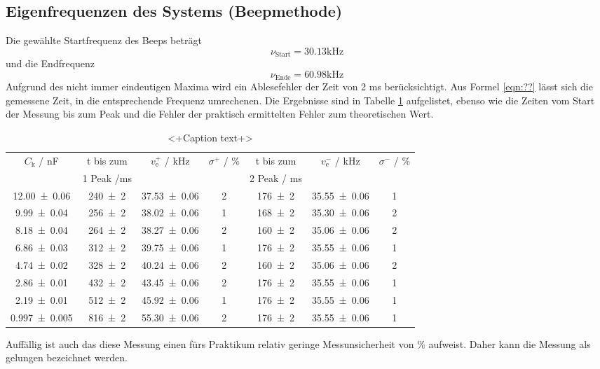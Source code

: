 \subsection{Eigenfrequenzen des Systems (Beepmethode)}
Die gewählte Startfrequenz des Beeps beträgt 
\begin{equation}
  \nu_\text{Start} = 30.13 \text{kHz}
\end{equation} 
und die Endfrequenz 
\begin{equation}
  \nu_\text{Ende} = 60.98 \text{kHz}
\end{equation}
Aufgrund des nicht immer eindeutigen Maxima wird ein Ablesefehler der Zeit von 2 ms berücksichtigt. Aus Formel \ref{eqn:??} lässt sich die gemessene Zeit, in die entsprechende Frequenz umrechenen. Die Ergebnisse sind in Tabelle \ref{tab:beep} aufgelistet, ebenso wie die Zeiten vom Start der Messung bis zum Peak und die Fehler der praktisch ermittelten Fehler zum theoretischen Wert.
\begin{table}
  \centering
  \begin{tabular}{c c c c c c c}
    \toprule
    $C_\text{k}$ / nF & t bis zum & $v_\text{e}^+$ / kHz & $\sigma^+$ / \% & t bis zum & $v_\text{e}^-$ / kHz & $\sigma^-$ / \%  \\
    &1 Peak /ms& & & 2 Peak / ms & & \\
    \midrule
    \num{12.00 +- 0.06}     & \num{240 +- 2} &\num{37.53 +- 0.06} & 2 & \num{176 +- 2} & \num{35.55 +- 0.06} & 1 \\
    \num{9.99 +- 0.04}      & \num{256 +- 2} &\num{38.02 +- 0.06} & 1 & \num{168 +- 2} & \num{35.30 +- 0.06} & 2 \\
    \num{8.18 +- 0.04}      & \num{264 +- 2} &\num{38.27 +- 0.06} & 2 & \num{160 +- 2} & \num{35.06 +- 0.06} & 2 \\
    \num{6.86 +- 0.03}      & \num{312 +- 2} &\num{39.75 +- 0.06} & 1 & \num{176 +- 2} & \num{35.55 +- 0.06} & 1 \\
    \num{4.74 +- 0.02}      & \num{328 +- 2} &\num{40.24 +- 0.06} & 2 & \num{160 +- 2} & \num{35.06 +- 0.06} & 2 \\
    \num{2.86 +- 0.01}      & \num{432 +- 2} &\num{43.45 +- 0.06} & 2 & \num{176 +- 2} & \num{35.55 +- 0.06} & 1 \\
    \num{2.19 +- 0.01}      & \num{512 +- 2} &\num{45.92 +- 0.06} & 1 & \num{176 +- 2} & \num{35.55 +- 0.06} & 1 \\
    \num{0.997 +- 0.005}    & \num{816 +- 2} &\num{55.30 +- 0.06} & 2 & \num{176 +- 2} & \num{35.55 +- 0.06} & 1 \\
    \bottomrule
  \end{tabular}
  \caption{<+Caption text+>}
  \label{tab:beep}
\end{table}
Auffällig ist auch das diese Messung einen fürs Praktikum relativ geringe Messunsicherheit von  \% aufweist. Daher kann die Messung als gelungen bezeichnet werden.
